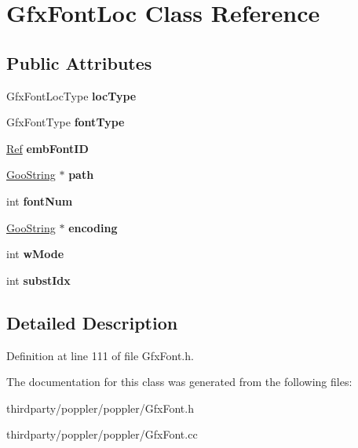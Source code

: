 \hypertarget{class_gfx_font_loc}{}\section{Gfx\+Font\+Loc Class Reference}
\label{class_gfx_font_loc}
\subsection*{Public Attributes}
\begin{DoxyCompactItemize}
\item 
\mbox{\label{class_gfx_font_loc_a14740599397570f23f6c761954052edf}} 
Gfx\+Font\+Loc\+Type {\bfseries loc\+Type}
\item 
\mbox{\label{class_gfx_font_loc_af02dcfafecd4c0bf81f3b5cbc9863b2b}} 
Gfx\+Font\+Type {\bfseries font\+Type}
\item 
\mbox{\label{class_gfx_font_loc_a5d5f7ee5a931da39de9c0b37ed5fae25}} 
\hyperlink{struct_ref}{Ref} {\bfseries emb\+Font\+ID}
\item 
\mbox{\label{class_gfx_font_loc_a6f90cc8586f70c560c9b50a406c6451b}} 
\hyperlink{class_goo_string}{Goo\+String} $\ast$ {\bfseries path}
\item 
\mbox{\label{class_gfx_font_loc_a0db4c6912aa6b5212177b42dc2e36ceb}} 
int {\bfseries font\+Num}
\item 
\mbox{\label{class_gfx_font_loc_ae09033480fe92b02a0f3be097f13ec34}} 
\hyperlink{class_goo_string}{Goo\+String} $\ast$ {\bfseries encoding}
\item 
\mbox{\label{class_gfx_font_loc_ad9e4163b08c516ee7b927d1f95b7043e}} 
int {\bfseries w\+Mode}
\item 
\mbox{\label{class_gfx_font_loc_a4b2b288b5f3cf10a98982d84589a0ad0}} 
int {\bfseries subst\+Idx}
\end{DoxyCompactItemize}


\subsection{Detailed Description}


Definition at line 111 of file Gfx\+Font.\+h.



The documentation for this class was generated from the following files\+:\begin{DoxyCompactItemize}
\item 
thirdparty/poppler/poppler/Gfx\+Font.\+h\item 
thirdparty/poppler/poppler/Gfx\+Font.\+cc\end{DoxyCompactItemize}
